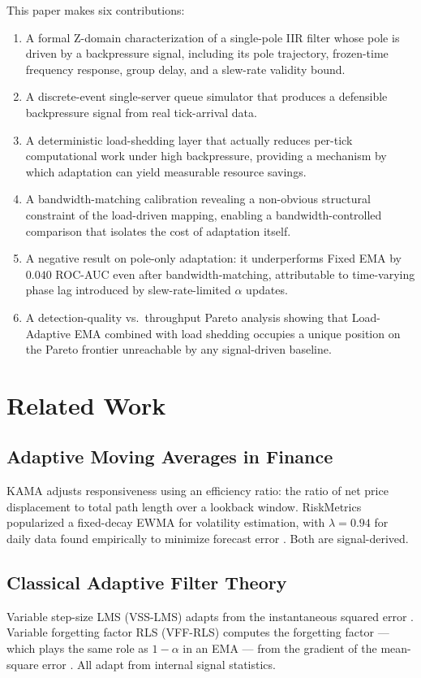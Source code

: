 \documentclass[conference]{IEEEtran}
\begin{document}
This paper makes six contributions:
\begin{enumerate}
\item A formal Z-domain characterization of a single-pole IIR filter whose
  pole is driven by a backpressure signal, including its pole trajectory,
  frozen-time frequency response, group delay, and a slew-rate validity bound.
\item A discrete-event single-server queue simulator that produces a
  defensible backpressure signal from real tick-arrival data.
\item A deterministic load-shedding layer that actually reduces per-tick
  computational work under high backpressure, providing a mechanism by which
  adaptation can yield measurable resource savings.
\item A bandwidth-matching calibration revealing a non-obvious structural
  constraint of the load-driven mapping, enabling a bandwidth-controlled
  comparison that isolates the cost of adaptation itself.
\item A negative result on pole-only adaptation: it underperforms Fixed EMA
  by $0.040$ ROC-AUC even after bandwidth-matching, attributable to
  time-varying phase lag introduced by slew-rate-limited $\alpha$ updates.
\item A detection-quality vs.\ throughput Pareto analysis showing that
  Load-Adaptive EMA combined with load shedding occupies a unique position
  on the Pareto frontier unreachable by any signal-driven baseline.
\end{enumerate}

\section{Related Work}

\subsection{Adaptive Moving Averages in Finance}
KAMA \cite{kama} adjusts responsiveness using an efficiency ratio: the ratio
of net price displacement to total path length over a lookback window.
RiskMetrics popularized a fixed-decay EWMA for volatility estimation, with
$\lambda=0.94$ for daily data found empirically to minimize forecast error
\cite{riskmetrics}. Both are signal-derived.

\subsection{Classical Adaptive Filter Theory}
Variable step-size LMS (VSS-LMS) adapts from the instantaneous squared error
\cite{vsslms}. Variable forgetting factor RLS (VFF-RLS) computes the
forgetting factor — which plays the same role as $1-\alpha$ in an EMA — from
the gradient of the mean-square error \cite{vffrls}. All adapt from internal
signal statistics.
\end{document}
